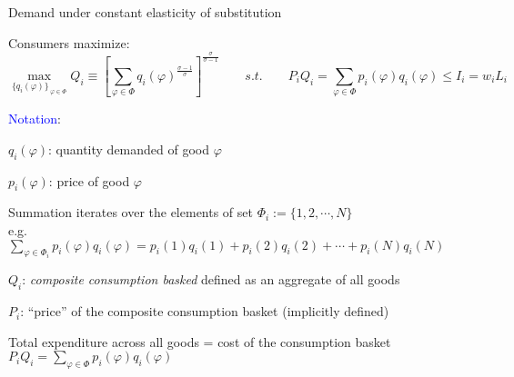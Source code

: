 \documentclass[notes,11pt, aspectratio=169, xcolor=table]{beamer}
\newcommand{\blue}[1]{\textcolor{blue}{#1}}
\newenvironment{wideitemize}{\itemize\addtolength{\itemsep}{10pt}}{\enditemize}
\begin{document}
\begin{frame}{Demand under constant elasticity of substitution}

\begin{wideitemize}
        \item Consumers maximize:
        \begin{equation*}
            \max_{\{q_i(\varphi)\}_{\
        \varphi \in \Phi}} Q_i \equiv \left[ \sum_{\varphi \in \Phi } q_i(
        \varphi)^{\tfrac{\sigma-1}{\sigma}} \right]^{\tfrac{\sigma}{\sigma-1} } \qquad s.t. \qquad  P_i Q_i =\sum_{\varphi \in \Phi } p_i(\varphi) q_i(\varphi) \le I_i = w_i L_i 
        \end{equation*}

\blue{Notation}:
        \begin{wideitemize}
            \item<2-> $q_i(\varphi)$: quantity demanded of good $\varphi$
            \item $p_i(\varphi)$: price of good $\varphi$
            \item<3-> Summation iterates over the elements of set $\Phi_i:=\{1, 2, \cdots, N\}$ \\
            \qquad e.g. $\sum_{\varphi \in \Phi_i } p_i(\varphi) q_i(\varphi) = p_i(1) q_i(1) + p_i(2) q_i(2) + \cdots + p_i(N) q_i(N)$
            \item<4-> $Q_i$: \textit{composite consumption basked} defined as an aggregate of all goods
            \item<5-> $P_i$: ``price'' of the composite consumption basket (implicitly defined)
            \item<5-> Total expenditure across all goods = cost of the consumption basket \\
            \qquad $P_i Q_i =\sum_{\varphi \in \Phi } p_i(\varphi) q_i(\varphi)$
        \end{wideitemize}
        
\end{wideitemize}
    
\end{frame}
\end{document}

